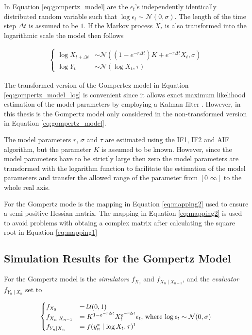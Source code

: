 \documentclass[twoside,openright]{report}
\begin{document}
In Equation \ref{eq:gompertz_model} are the $\epsilon_t$'s independently identically distributed random variable such that $\log \epsilon_t \sim \mathcal{N} (0, \sigma)$. The length of the time step $\Delta t$ is assumed to be $1$. If the Markov process $X_t$ is also transformed into the logarithmic scale the model then follows


\begin{align} \label{eq:gompertz_model_log}
\begin{cases}
    \log X_{t + \Delta t} &\sim \mathcal{N} ( (1-e^{-r \Delta t}) K + e^{-r \Delta t} X_{t}, \sigma) \\
    \log Y_t &\sim \mathcal{N} ( \log X_t, \tau )
\end{cases}
\end{align}


The transformed version of the Gompertez model in Equation \ref{eq:gompertz_model_log} is convenient since it allows exact maximum likelihood estimation of the model parameters by employing a Kalman filter  \cite{ionides2015inference}. However, in this thesis is the Gompertz model  only considered in the non-transformed version in Equation \ref{eq:gompertz_model}. 

The model parameters $r$, $\sigma$ and $\tau$ are estimated using the IF1, IF2 and AIF algorithm, but the parameter $K$ is assumed to be known. However, since the model parameters have to be strictly large then zero the model parameters are transformed with the logarithm function to facilitate the estimation of the model parameters and transfer the allowed range of the parameter from $[ 0 \,\, \infty]$ to the whole real axis.   

For the Gompertz mode is the mapping in Equation \ref{eq:mapping2} used to ensure a semi-positive Hessian matrix. The mapping in Equation \ref{eq:mapping2} is used to avoid problems with obtaing a complex matrix after calculating the square root in Equation \ref{eq:mapping1}


\subsection{Simulation Results for the Gompertz Model}

For the Gompertz model is the \textit{simulators} $f_{X_0}$ and $f_{X_n \mid X_{n-1}}$, and the \textit{evaluator} $f_{Y_n \mid X_n}$ set to 

\begin{align} \label{eq:simple_AR_model}
\begin{cases}
    f_{X_0} &= \mathcal{U}(0,1) \\
    f_{X_n \mid X_{n-1}} &= K^{1-e^{-r \Delta t}} X_{t}^{e^{ -r \Delta t }} \epsilon_t, \, \text{where} \, \log \epsilon_t \sim \mathcal{N} (0, \sigma) \\
    f_{Y_n \mid X_n} &= f(y^{*}_{n} \mid \log X_t , \tau) \footnotemark 
\end{cases}
\end{align}
\end{document}
